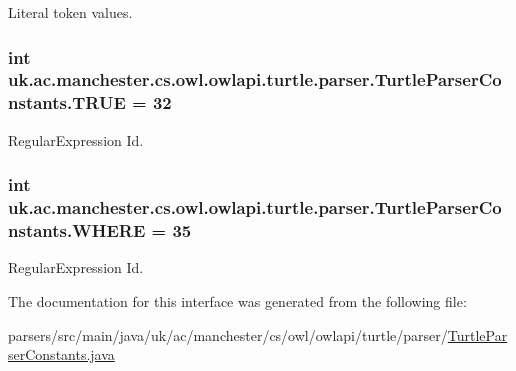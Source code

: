 Literal token values. \hypertarget{interfaceuk_1_1ac_1_1manchester_1_1cs_1_1owl_1_1owlapi_1_1turtle_1_1parser_1_1_turtle_parser_constants_aade67e4c2e87fd0be06f1f6cd89bd466}{
\subsubsection[{T\-R\-U\-E}]{\setlength{\rightskip}{0pt plus 5cm}int uk.\-ac.\-manchester.\-cs.\-owl.\-owlapi.\-turtle.\-parser.\-Turtle\-Parser\-Constants.\-T\-R\-U\-E = 32}}\label{interfaceuk_1_1ac_1_1manchester_1_1cs_1_1owl_1_1owlapi_1_1turtle_1_1parser_1_1_turtle_parser_constants_aade67e4c2e87fd0be06f1f6cd89bd466}
Regular\-Expression Id. \hypertarget{interfaceuk_1_1ac_1_1manchester_1_1cs_1_1owl_1_1owlapi_1_1turtle_1_1parser_1_1_turtle_parser_constants_ab0dc08ac49562fe6dbc323823586a38e}{
\subsubsection[{W\-H\-E\-R\-E}]{\setlength{\rightskip}{0pt plus 5cm}int uk.\-ac.\-manchester.\-cs.\-owl.\-owlapi.\-turtle.\-parser.\-Turtle\-Parser\-Constants.\-W\-H\-E\-R\-E = 35}}\label{interfaceuk_1_1ac_1_1manchester_1_1cs_1_1owl_1_1owlapi_1_1turtle_1_1parser_1_1_turtle_parser_constants_ab0dc08ac49562fe6dbc323823586a38e}
Regular\-Expression Id. 

The documentation for this interface was generated from the following file\-:\begin{DoxyCompactItemize}
\item 
parsers/src/main/java/uk/ac/manchester/cs/owl/owlapi/turtle/parser/\hyperlink{_turtle_parser_constants_8java}{Turtle\-Parser\-Constants.\-java}\end{DoxyCompactItemize}
